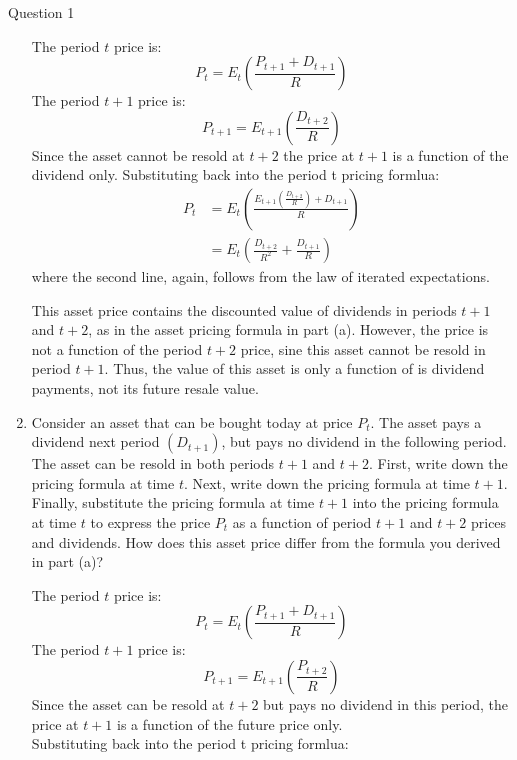 \documentclass[a4paper]{article}
\begin{document}
\begin{questionbox}{Question 1}
\begin{enumerate}[resume*]
			\begin{explanationbox}
				The period \( t \) price is:
				\[
					P_t = E_t \left( \frac{P_{t+1} + D_{t+1}}{R} \right)
				\]
				The period \( t+1 \) price is:
				\[
					P_{t+1} = E_{t+1}\left( \frac{D_{t+2}}{R} \right)
				\]
				Since the asset cannot be resold at \( t+2 \) the price at \( t+1 \) is a function of the dividend only. Substituting back into the period t pricing formlua:
				\begin{align*}
					P_t &= E_t \left( \frac{E_{t+1} \left( \frac{D_{t+2}}{R} \right) + D_{t+1}}{R} \right)\\
					&=E_t \left( \frac{D_{t+2}}{R^2} + \frac{D_{t+1}}{R} \right)
				\end{align*}
				where the second line, again, follows from the law of iterated expectations.
			\end{explanationbox}
			\begin{explanationbox}
				This asset price contains the discounted value of dividends in periods \( t+1 \) and \( t+2 \), as in the asset pricing formula in part (a). However, the price is not a function of the period \( t+2 \) price, sine this asset cannot be resold in period \( t+1 \). Thus, the value of this asset is only a function of is dividend payments, not its future resale value.
			\end{explanationbox}
			\item Consider an asset that can be bought today at price \( P_t \). The asset pays a dividend next period \( (D_{t+1}) \), but pays no dividend in the following period. The asset can be resold in both periods \( t+1 \) and \( t+2 \). First, write down the pricing formula at time \( t \). Next, write down the pricing formula at time \( t+1 \). Finally, substitute the pricing formula at time \( t+1 \) into the pricing formula at time \( t \) to express the price \( P_t \) as a function of period \( t+1 \) and \( t+2 \) prices and dividends. How does this asset price differ from the formula you derived in part (a)?
			\begin{explanationbox}
				The period \( t \) price is:
				\[
					P_t = E_t \left( \frac{P_{t+1} + D_{t+1}}{R} \right)
				\]
				The period \( t+1 \) price is:
				\[
					P_{t+1} = E_{t+1}\left( \frac{P_{t+2}}{R} \right)
				\]
				Since the asset can be resold at \( t+2 \) but pays no dividend in this period, the price at \( t+1 \) is a function of the future price only.\\
				Substituting back into the period t pricing formlua:
				\begin{align*}

\end{align*}
\end{explanationbox}
\end{enumerate}
\end{questionbox}
\end{document}
